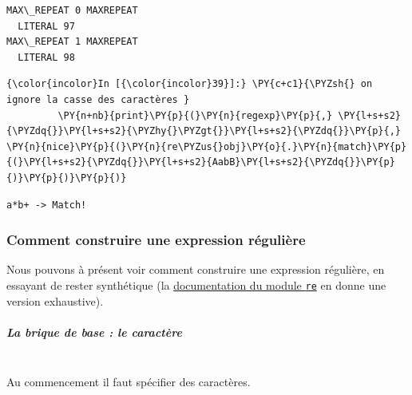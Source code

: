     \begin{Verbatim}[commandchars=\\\{\}]
MAX\_REPEAT 0 MAXREPEAT
  LITERAL 97
MAX\_REPEAT 1 MAXREPEAT
  LITERAL 98

    \end{Verbatim}

    \begin{Verbatim}[commandchars=\\\{\}]
{\color{incolor}In [{\color{incolor}39}]:} \PY{c+c1}{\PYZsh{} on ignore la casse des caractères }
         \PY{n+nb}{print}\PY{p}{(}\PY{n}{regexp}\PY{p}{,} \PY{l+s+s2}{\PYZdq{}}\PY{l+s+s2}{\PYZhy{}\PYZgt{}}\PY{l+s+s2}{\PYZdq{}}\PY{p}{,} \PY{n}{nice}\PY{p}{(}\PY{n}{re\PYZus{}obj}\PY{o}{.}\PY{n}{match}\PY{p}{(}\PY{l+s+s2}{\PYZdq{}}\PY{l+s+s2}{AabB}\PY{l+s+s2}{\PYZdq{}}\PY{p}{)}\PY{p}{)}\PY{p}{)}
\end{Verbatim}


    \begin{Verbatim}[commandchars=\\\{\}]
a*b+ -> Match!

    \end{Verbatim}

    \hypertarget{comment-construire-une-expression-ruxe9guliuxe8re}{%
\subsubsection{Comment construire une expression
régulière}\label{comment-construire-une-expression-ruxe9guliuxe8re}}

    Nous pouvons à présent voir comment construire une expression régulière,
en essayant de rester synthétique (la
\href{https://docs.python.org/3/library/re.html}{documentation du module
\texttt{re}} en donne une version exhaustive).

    \hypertarget{la-brique-de-base-le-caractuxe8re}{%
\subparagraph{La brique de base : le
caractère\\\\}\label{la-brique-de-base-le-caractuxe8re}}

    Au commencement il faut spécifier des caractères.

